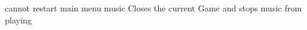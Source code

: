 
\begin{DoxyRefList}
\item[\label{bug__bug000001}%
\hypertarget{bug__bug000001}{}%
Member \hyperlink{class_game_screen_af2a5d4c707d0d0f47201eec498b77bd6}{Game\-Screen\-:\-:close\-Event} (Q\-Close\-Event $\ast$)]cannot restart main menu music Closes the current Game and stops music from playing 
\end{DoxyRefList}